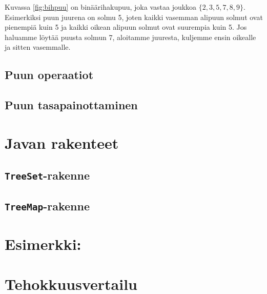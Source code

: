 Kuvassa \ref{fig:bihpuu} on binäärihakupuu,
joka vastaa joukkoa $\{2,3,5,7,8,9\}$.
Esimerkiksi puun juurena on solmu 5,
joten kaikki vasemman alipuun solmut
ovat pienempiä kuin 5 ja kaikki oikean alipuun
solmut ovat suurempia kuin 5.
Jos haluamme löytää puusta solmun 7,
aloitamme juuresta, kuljemme ensin oikealle
ja sitten vasemmalle.

\subsection{Puun operaatiot}

\subsection{Puun tasapainottaminen}

\section{Javan rakenteet}

\subsection{\texttt{TreeSet}-rakenne}

\subsection{\texttt{TreeMap}-rakenne}

\section{Esimerkki: }

\section{Tehokkuusvertailu}